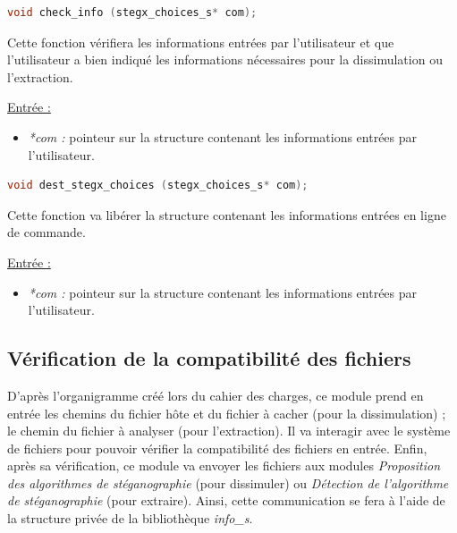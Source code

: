 \documentclass[11pt]{article}
\begin{document}
\begin{lstlisting}[language=c]
void check_info (stegx_choices_s* com);
\end{lstlisting}

Cette fonction vérifiera les informations entrées par l'utilisateur et 
que l'utilisateur a bien indiqué les informations nécessaires pour 
la dissimulation ou l'extraction. \newline

\underline{Entrée :} 
\begin{itemize}
\item \textit{*com :} pointeur sur la structure contenant les informations 
entrées par l'utilisateur. 
\newline 
\end{itemize}

\begin{lstlisting}[language=c]
void dest_stegx_choices (stegx_choices_s* com);
\end{lstlisting}

Cette fonction va libérer la structure contenant les informations entrées 
en ligne de commande. \newline

\underline{Entrée :} 
\begin{itemize}
\item \textit{*com :} pointeur sur la structure contenant les informations 
entrées par l'utilisateur. 
\newline 
\end{itemize}

\subsection{Vérification de la compatibilité des fichiers}

D'après l'organigramme créé lors du cahier des charges, ce module prend en 
entrée les chemins du fichier hôte et du fichier à cacher (pour la dissimulation) ; 
le chemin du fichier à analyser (pour l'extraction). Il va interagir avec 
le système de fichiers pour pouvoir vérifier la compatibilité des fichiers en entrée. 
Enfin, après sa vérification, ce module va envoyer les fichiers aux modules 
\textit{Proposition des algorithmes de stéganographie} (pour dissimuler) ou 
\textit{Détection de l'algorithme de stéganographie} (pour extraire). 
Ainsi, cette communication se fera à l'aide de la structure privée de la 
bibliothèque \textit{info\_s}. 
\newline
\end{document}
